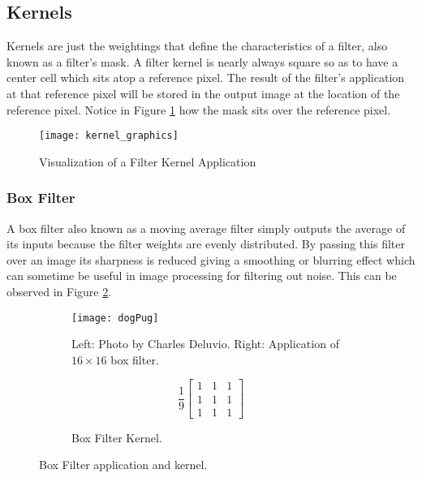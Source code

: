 \subsection{Kernels}

Kernels are just the weightings that define the characteristics of a filter, also known as a filter's mask. A filter kernel is nearly always square so as to have a center cell which sits atop a reference pixel. The result of the filter's application at that reference pixel will be stored in the output image at the location of the reference pixel. Notice in Figure \ref{fig:kernel_graphics} how the mask sits over the reference pixel.

\begin{figure}[H]
 \centering
 \centering\texttt{[image: kernel\_graphics]}
 \caption{Visualization of a Filter Kernel Application}
 \label{fig:kernel_graphics}
\end{figure}

\subsubsection{Box Filter}
\label{subsubsection:boxfilter}
A box filter also known as a moving average filter simply outputs the average of its inputs because the filter weights are evenly distributed. By passing this filter over an image its sharpness is reduced giving a smoothing or blurring effect which can sometime be useful in image processing for filtering out noise. This can be observed in Figure \ref{fig:roughDog}.

\begin{figure}[H]
 \centering
 \begin{subfigure}[b]{0.75\textwidth}
   \centering\texttt{[image: dogPug]}
   \caption{Left: Photo by Charles Deluvio. Right: Application of $16\times16$ box filter.}
   \label{fig:roughDog}
 \end{subfigure}
 \begin{subfigure}[b]{0.25\textwidth}
   \centering
   \[
     \frac{1}{9}
   \begin{bmatrix}
      1 & 1 & 1 \\
      1 & 1 & 1 \\
      1 & 1 & 1
   \end{bmatrix}
   \]
   \caption{Box Filter Kernel.}
   \label{fig:boxkernel}
 \end{subfigure}
 \caption{Box Filter application and kernel.}
 \label{fig:boxfilter}
\end{figure}

